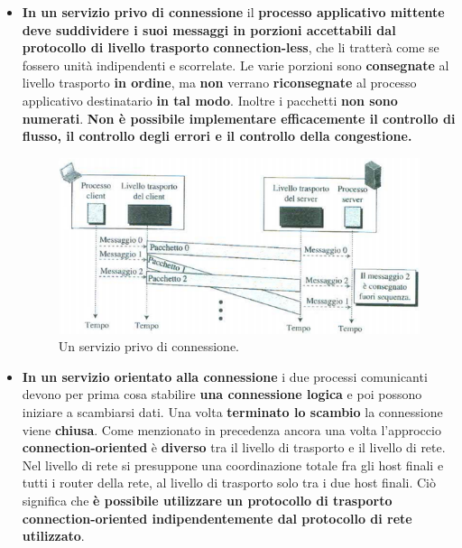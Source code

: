 \documentclass[11pt,a4paper]{article}
\theoremstyle{definition}
\begin{document}
\begin{itemize}
	\item \textbf{In un servizio privo di connessione} il \textbf{processo applicativo mittente  deve suddividere i suoi messaggi in porzioni accettabili dal protocollo di livello trasporto} \textbf{connection-less}, che li tratterà come se fossero unità indipendenti e scorrelate. Le varie porzioni sono \textbf{consegnate} al livello trasporto \textbf{in ordine}, ma \textbf{non} verrano \textbf{riconsegnate} al processo applicativo destinatario \textbf{in tal modo}. Inoltre i pacchetti \textbf{non sono numerati}. \textbf{Non è possibile implementare efficacemente il controllo di flusso, il controllo degli errori e il controllo della congestione.}
	      \begin{figure}[!h]
		      \includegraphics[scale=0.5]{Immagini/Connection_less.png}
		      \centering
		      \caption{Un servizio privo di connessione.}
	      \end{figure}
	\item \textbf{In un servizio orientato alla connessione} i due processi comunicanti devono per prima cosa stabilire \textbf{una connessione logica} e poi possono iniziare a scambiarsi dati. Una volta \textbf{terminato lo scambio} la connessione viene \textbf{chiusa}. Come menzionato in precedenza ancora una volta l'approccio \textbf{connection-oriented} è \textbf{diverso} tra il livello di trasporto e il livello di rete. Nel livello di rete si presuppone una coordinazione totale fra gli host finali e tutti i router della rete, al livello di trasporto solo tra i due host finali. Ciò significa che \textbf{è possibile utilizzare un protocollo di trasporto connection-oriented indipendentemente dal protocollo di rete utilizzato}.
\end{itemize}
\newpage
\end{document}
